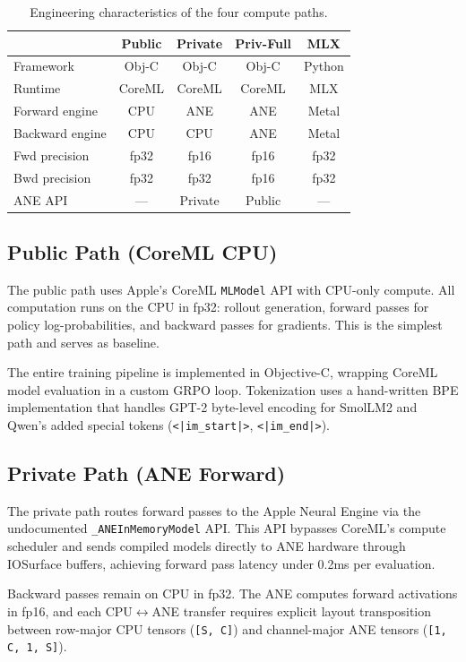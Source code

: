 \documentclass[11pt]{article}
\begin{document}
\begin{table}[ht]
\centering
\caption{Engineering characteristics of the four compute paths.}
\label{tab:paths}
\small
\begin{tabular}{lcccc}
\toprule
 & \textbf{Public} & \textbf{Private} & \textbf{Priv-Full} & \textbf{MLX} \\
\midrule
Framework & Obj-C & Obj-C & Obj-C & Python \\
Runtime & CoreML & CoreML & CoreML & MLX \\
Forward engine & CPU & ANE & ANE & Metal \\
Backward engine & CPU & CPU & ANE & Metal \\
Fwd precision & fp32 & fp16 & fp16 & fp32 \\
Bwd precision & fp32 & fp32 & fp16 & fp32 \\
ANE API & --- & Private & Public & --- \\
\bottomrule
\end{tabular}
\end{table}

\subsection{Public Path (CoreML CPU)}

The public path uses Apple's CoreML \texttt{MLModel} API with CPU-only compute.  All computation runs on the CPU in fp32: rollout generation, forward passes for policy log-probabilities, and backward passes for gradients.  This is the simplest path and serves as baseline.

The entire training pipeline is implemented in Objective-C, wrapping CoreML model evaluation in a custom GRPO loop.  Tokenization uses a hand-written BPE implementation that handles GPT-2 byte-level encoding for SmolLM2 and Qwen's added special tokens (\texttt{<|im\_start|>}, \texttt{<|im\_end|>}).

\subsection{Private Path (ANE Forward)}

The private path routes forward passes to the Apple Neural Engine via the undocumented \texttt{\_ANEIn\-Memory\-Model} API.  This API bypasses CoreML's compute scheduler and sends compiled models directly to ANE hardware through IOSurface buffers, achieving forward pass latency under 0.2ms per evaluation.

Backward passes remain on CPU in fp32.  The ANE computes forward activations in fp16, and each CPU$\leftrightarrow$ANE transfer requires explicit layout transposition between row-major CPU tensors (\texttt{[S, C]}) and channel-major ANE tensors (\texttt{[1, C, 1, S]}).
\end{document}

